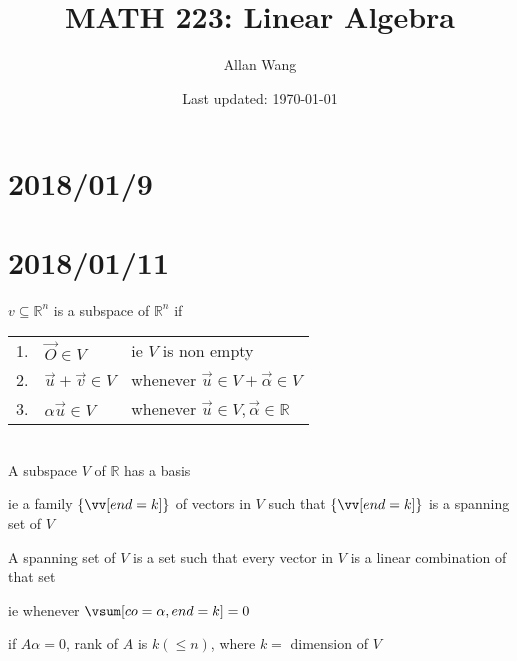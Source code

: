 \documentclass[12pt]{article}
\author{Allan Wang}
\date{Last updated: \today}
\title{MATH 223: Linear Algebra}
\newcommand{\real}[0]{\mathbb{R}}
\newcommand{\bb}[1]{\left\{#1\right\}}
\begin{document}
	
	\onehalfspacing
	\maketitle
	\tableofcontents
	\pagebreak
	\section{2018/01/9}
	
	
	\section{2018/01/11}
	
	$v \subseteq \real^n$ is a subspace of $\real^n$ if \\
	
	\begin{tabular}{@{}l l l}
		1. & $\vec{O} \in V$ & ie $V$ is non empty \\
		2. & $\vec{u} + \vec{v} \in V$ & whenever $\vec{u} \in V + \vec{\alpha} \in V$ \\
		3. & $\alpha \vec{u} \in V$ & whenever $\vec{u} \in V, \vec{\alpha} \in \real$	
	\end{tabular} \\
	
	A subspace $V$ of $\real$ has a basis
	
	ie a family $\bb{\vv[end=k]}$ of vectors in $V$ such that $\bb{\vv[end=k]}$ is a spanning set of $V$
	
	A spanning set of $V$ is a set such that every vector in $V$ is a linear combination of that set
	
	ie whenever $\vsum[co=\alpha,end=k] = 0$
	
	if $A\alpha = 0$, rank of $A$ is $k (\le n)$, where $k =$ dimension of $V$
	
\end{document}

